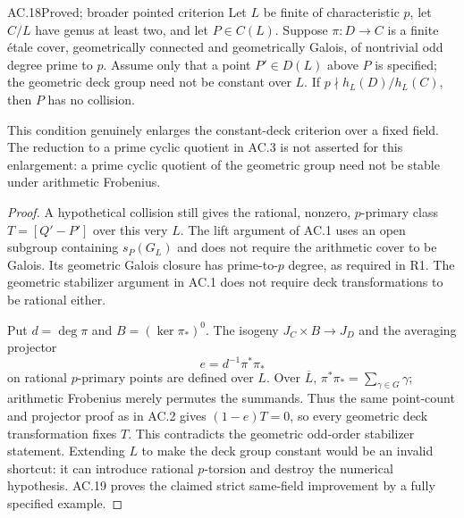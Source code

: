 
\begin{claim}{AC.18}{Proved; broader pointed criterion}
Let $L$ be finite of characteristic $p$, let $C/L$ have genus at least
two, and let $P\in C(L)$.  Suppose $\pi:D\to C$ is a finite \'etale
cover, geometrically connected and geometrically Galois, of nontrivial
odd degree prime to $p$.  Assume only that a point $P'\in D(L)$ above
$P$ is specified; the geometric deck group need not be constant over
$L$.  If $p\nmid h_L(D)/h_L(C)$, then $P$ has no collision.

This condition genuinely enlarges the constant-deck criterion over a
fixed field.  The reduction to a prime cyclic quotient in AC.3 is not
asserted for this enlargement: a prime cyclic quotient of the geometric
group need not be stable under arithmetic Frobenius.
\end{claim}
\begin{proof}
A hypothetical collision still gives the rational, nonzero, $p$-primary
class $T=[Q'-P']$ over this very $L$.  The lift argument of AC.1 uses an
open subgroup containing $s_P(G_L)$ and does not require the arithmetic
cover to be Galois.  Its geometric Galois closure has prime-to-$p$ degree,
as required in R1.  The geometric stabilizer argument in AC.1 does not
require deck transformations to be rational either.

Put $d=\deg\pi$ and $B=(\ker\pi_*)^0$.  The isogeny
$J_C\times B\to J_D$ and the averaging projector
\[
                 e=d^{-1}\pi^*\pi_*
\]
on rational $p$-primary points are defined over $L$.
Over $\overline L$, $\pi^*\pi_*=\sum_{\gamma\in G}\gamma$; arithmetic
Frobenius merely permutes the summands.  Thus the same point-count and
projector proof as in AC.2 gives $(1-e)T=0$, so every geometric deck
transformation fixes $T$.  This contradicts the geometric odd-order
stabilizer statement.  Extending $L$ to make the deck group constant
would be an invalid shortcut: it can introduce rational $p$-torsion
and destroy the numerical hypothesis.  AC.19 proves the claimed strict
same-field improvement by a fully specified example.
\end{proof}

